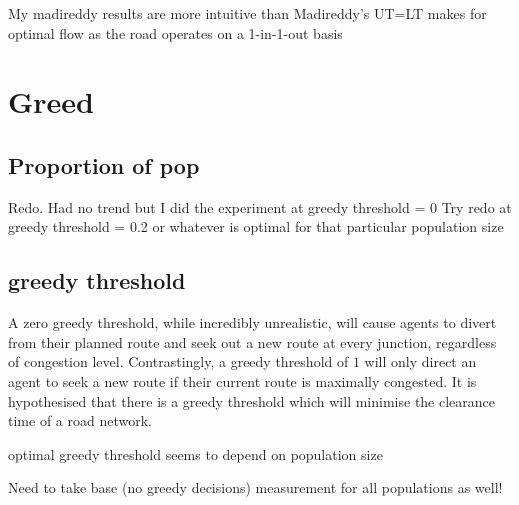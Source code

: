 
My madireddy results are more intuitive than Madireddy's
UT=LT makes for optimal flow as the road operates on a 1-in-1-out basis

\section{Greed}

\subsection{Proportion of pop}

Redo. Had no trend but I did the experiment at greedy threshold = 0
Try redo at greedy threshold = 0.2 or whatever is optimal for that particular population size 

\subsection{greedy threshold}
A zero greedy threshold, while incredibly unrealistic, will cause agents to divert from their planned route and seek out a new route at every junction, regardless of congestion level. Contrastingly, a greedy threshold of $1$ will only direct an agent to seek a new route if their current route is maximally congested. It is hypothesised that there is a greedy threshold which will minimise the clearance time of a road network.

optimal greedy threshold seems to depend on population size

Need to take base (no greedy decisions) measurement for all populations as well!

